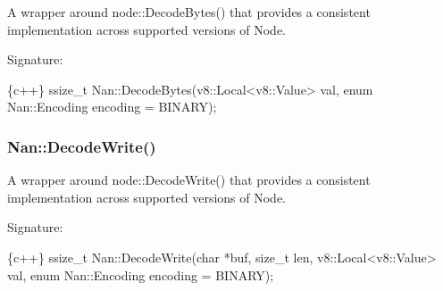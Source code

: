 A wrapper around {\ttfamily node\+::\+Decode\+Bytes()} that provides a consistent implementation across supported versions of Node.

Signature\+:


\begin{DoxyCode}
\{c++\}
ssize\_t Nan::DecodeBytes(v8::Local<v8::Value> val,
                         enum Nan::Encoding encoding = BINARY);
\end{DoxyCode}


\label{_api_nan_decode_write}%
 \subsubsection*{Nan\+::\+Decode\+Write()}

A wrapper around {\ttfamily node\+::\+Decode\+Write()} that provides a consistent implementation across supported versions of Node.

Signature\+:


\begin{DoxyCode}
\{c++\}
ssize\_t Nan::DecodeWrite(char *buf,
                         size\_t len,
                         v8::Local<v8::Value> val,
                         enum Nan::Encoding encoding = BINARY);
\end{DoxyCode}
 
